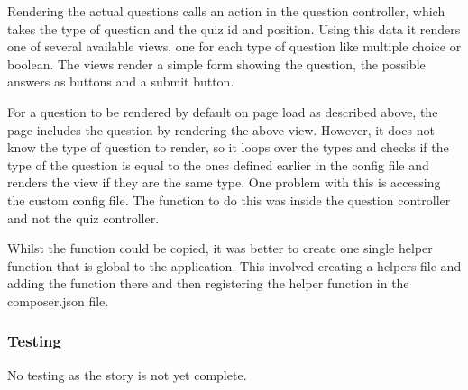 Rendering the actual questions calls an action in the question controller, which takes the type of question and the quiz id and position. Using this data it renders one of several available views, one for each type of question like multiple choice or boolean. The views render a simple form showing the question, the possible answers as buttons and a submit button.

For a question to be rendered by default on page load as described above, the page includes the question by rendering the above view. However, it does not know the type of question to render, so it loops over the types and checks if the type of the question is equal to the ones defined earlier in the config file and renders the view if they are the same type. One problem with this is accessing the custom config file. The function to do this was inside the question controller and not the quiz controller. 

Whilst the function could be copied, it was better to create one single helper function that is global to the application. This involved creating a helpers file and adding the function there and then registering the helper function in the composer.json file\cite{laravel-helper-function}.

\subsubsection{Testing}
No testing as the story is not yet complete.
\newpage

